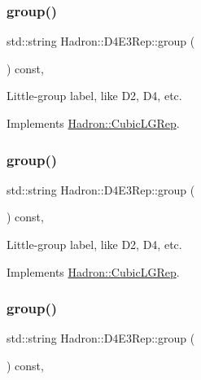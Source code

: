 \subsubsection{\texorpdfstring{group()}{group()}\hspace{0.1cm}{\footnotesize\ttfamily [3/5]}}
{\footnotesize\ttfamily std\+::string Hadron\+::\+D4\+E3\+Rep\+::group (\begin{DoxyParamCaption}{ }\end{DoxyParamCaption}) const\hspace{0.3cm}{\ttfamily [inline]}, {\ttfamily [virtual]}}

Little-\/group label, like D2, D4, etc. 

Implements \mbox{\hyperlink{structHadron_1_1CubicLGRep_a9bdb14b519a611d21379ed96a3a9eb41}{Hadron\+::\+Cubic\+L\+G\+Rep}}.

\mbox{\label{structHadron_1_1D4E3Rep_a5bae515c0b50b8f5e96c3d42b8f32f4d}} 
\subsubsection{\texorpdfstring{group()}{group()}\hspace{0.1cm}{\footnotesize\ttfamily [4/5]}}
{\footnotesize\ttfamily std\+::string Hadron\+::\+D4\+E3\+Rep\+::group (\begin{DoxyParamCaption}{ }\end{DoxyParamCaption}) const\hspace{0.3cm}{\ttfamily [inline]}, {\ttfamily [virtual]}}

Little-\/group label, like D2, D4, etc. 

Implements \mbox{\hyperlink{structHadron_1_1CubicLGRep_a9bdb14b519a611d21379ed96a3a9eb41}{Hadron\+::\+Cubic\+L\+G\+Rep}}.

\mbox{\label{structHadron_1_1D4E3Rep_a5bae515c0b50b8f5e96c3d42b8f32f4d}} 
\subsubsection{\texorpdfstring{group()}{group()}\hspace{0.1cm}{\footnotesize\ttfamily [5/5]}}
{\footnotesize\ttfamily std\+::string Hadron\+::\+D4\+E3\+Rep\+::group (\begin{DoxyParamCaption}{ }\end{DoxyParamCaption}) const\hspace{0.3cm}{\ttfamily [inline]}, {\ttfamily [virtual]}}

